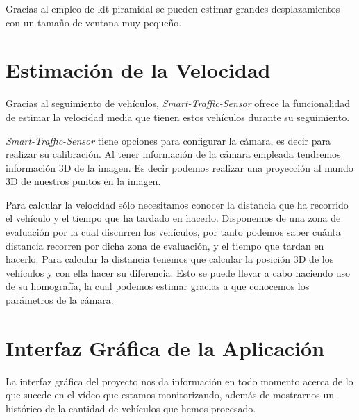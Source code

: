 Gracias al empleo de \acrshort{klt} piramidal se pueden estimar grandes desplazamientos con un tamaño de ventana muy pequeño.


\section{Estimación de la Velocidad}

Gracias al seguimiento de vehículos, \textit{Smart-Traffic-Sensor} ofrece la funcionalidad de estimar la velocidad media que tienen estos vehículos durante su seguimiento.

\textit{Smart-Traffic-Sensor} tiene opciones para configurar la cámara, es decir para realizar su calibración. Al tener información de la cámara empleada tendremos información 3D de la imagen. Es decir podemos realizar una proyección al mundo 3D de nuestros puntos en la imagen.

Para calcular la velocidad sólo necesitamos conocer la distancia que ha recorrido el vehículo y el tiempo que ha tardado en hacerlo. Disponemos de una zona de evaluación por la cual discurren los vehículos, por tanto podemos saber cuánta distancia recorren por dicha zona de evaluación, y el tiempo que tardan en hacerlo. Para calcular la distancia tenemos que calcular la posición 3D de los vehículos y con ella hacer su diferencia. Esto se puede llevar a cabo haciendo uso de su homografía, la cual podemos estimar gracias a que conocemos los parámetros de la cámara.

\section{Interfaz Gráfica de la Aplicación}

La interfaz gráfica del proyecto nos da información en todo momento acerca de lo que sucede en el vídeo que estamos monitorizando, además de mostrarnos un histórico de la cantidad de vehículos que hemos procesado.

